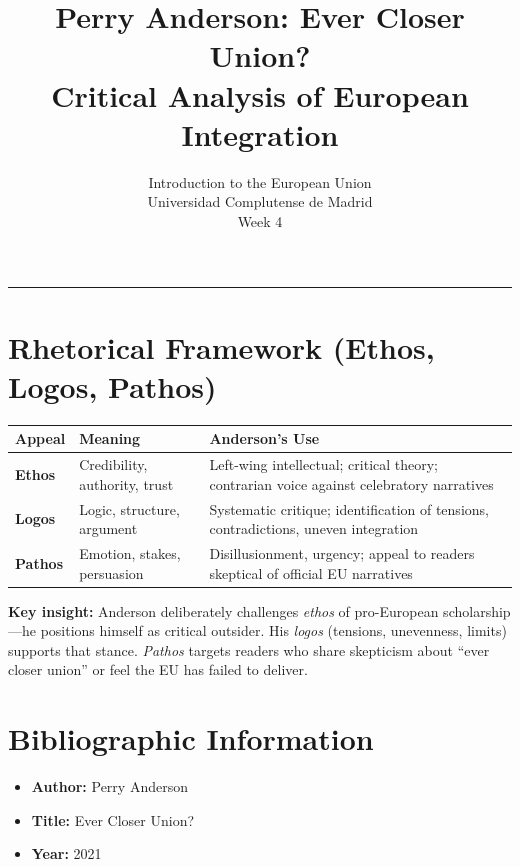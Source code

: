 \documentclass[11pt,a4paper]{article}
\begin{document}
\title{Perry Anderson: Ever Closer Union?\\Critical Analysis of European Integration}
\author{Introduction to the European Union\\Universidad Complutense de Madrid\\Week 4}
\date{}
\maketitle
\vspace{-1em}
\hrule
\vspace{1em}

\section*{Rhetorical Framework (Ethos, Logos, Pathos)}

\begin{table}[h]
\centering
\begin{tabular}{@{}lll@{}}
\toprule
\textbf{Appeal} & \textbf{Meaning} & \textbf{Anderson's Use} \\
\midrule
\textbf{Ethos} & Credibility, authority, trust & Left-wing intellectual; critical theory; contrarian voice against celebratory narratives \\
\textbf{Logos} & Logic, structure, argument & Systematic critique; identification of tensions, contradictions, uneven integration \\
\textbf{Pathos} & Emotion, stakes, persuasion & Disillusionment, urgency; appeal to readers skeptical of official EU narratives \\
\bottomrule
\end{tabular}
\end{table}

\textbf{Key insight:} Anderson deliberately challenges \textit{ethos} of pro-European scholarship---he positions himself as critical outsider. His \textit{logos} (tensions, unevenness, limits) supports that stance. \textit{Pathos} targets readers who share skepticism about ``ever closer union'' or feel the EU has failed to deliver.

\section*{Bibliographic Information}

\begin{itemize}
\item \textbf{Author:} Perry Anderson
\item \textbf{Title:} Ever Closer Union?
\item \textbf{Year:} 2021
\end{itemize}
\end{document}
